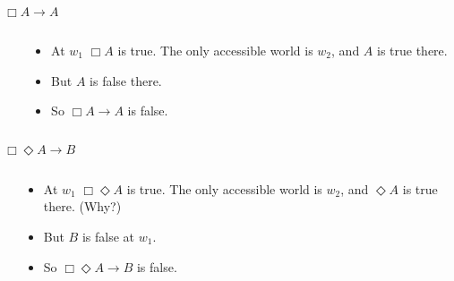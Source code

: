 \documentclass[
  ignorenonframetext,
]{beamer}
\renewcommand{\,}{\text{, }}
\begin{document}
\begin{frame}{\(\Box A \rightarrow A\)}
\protect\hypertarget{box-a-rightarrow-a}{}

\begin{columns}
    \begin{column}{0.45\textwidth}
    \end{column}
    \begin{column}{0.5\textwidth}
    \begin{itemize}
    \item At $w_1$ $\Box A$ is true. The only accessible world is $w_2$, and $A$ is true there.
    \item But $A$ is false there.
    \item So $\Box A \rightarrow A$ is false.
    \end{itemize}
  \end{column}
\end{columns}

\end{frame}

\begin{frame}{\(\Box \Diamond A \rightarrow B\)}
\protect\hypertarget{box-diamond-a-rightarrow-b}{}

\begin{columns}
    \begin{column}{0.45\textwidth}
    \end{column}
    \begin{column}{0.5\textwidth}
    \begin{itemize}
    \item At $w_1$ $\Box \Diamond A$ is true. The only accessible world is $w_2$, and $\Diamond A$ is true there. (Why?)
    \item But $B$ is false at $w_1$.
    \item So $\Box \Diamond A \rightarrow B$ is false.
    \end{itemize}
  \end{column}
\end{columns}

\end{frame}
\end{document}
